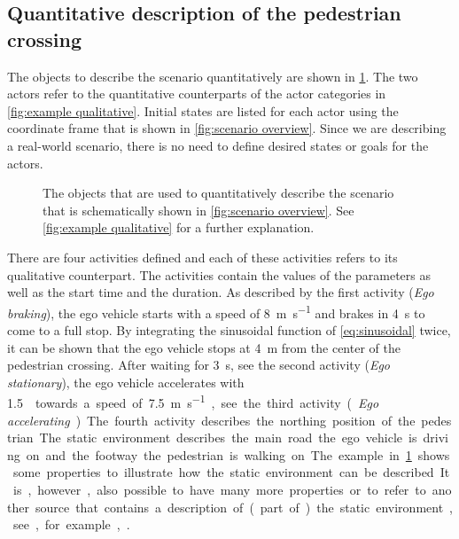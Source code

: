 \subsection{Quantitative description of the pedestrian crossing}
\label{sec:example quantitative}
The objects to describe the scenario quantitatively are shown in \cref{fig:example quantitative}. The two actors refer to the quantitative counterparts of the actor categories in \cref{fig:example qualitative}. Initial states are listed for each actor using the coordinate frame that is shown in \cref{fig:scenario overview}. 
Since we are describing a real-world scenario, there is no need to define desired states or goals for the actors.

\cbend
\begin{figure}
	\centering
	
	\caption{\cbstart The objects that are used to quantitatively describe the scenario that is schematically shown in \cref{fig:scenario overview}. See \cref{fig:example qualitative} for a further explanation.\cbend}
	\label{fig:example quantitative}
\end{figure}
\cbstart

There are four activities defined and each of these activities refers to its qualitative counterpart. The activities contain the values of the parameters as well as the start time and the duration. As described by the first activity (\emph{Ego braking}), the ego vehicle starts with a speed of \SI{8}{\meter\per\second} and brakes in \SI{4}{\second} to come to a full stop. By integrating the sinusoidal function of \cref{eq:sinusoidal} twice, it can be shown that the ego vehicle stops at \SI{4}{\meter} from the center of the pedestrian crossing. After waiting for \SI{3}{\second}, see the second activity (\emph{Ego stationary}), the ego vehicle accelerates with \SI{1.5}{\meter\per\second\square} towards a speed of \SI{7.5}{\meter\per\second}, see the third activity (\emph{Ego accelerating}). The fourth activity describes the northing position of the pedestrian.

The static environment describes the main road the ego vehicle is driving on and the footway the pedestrian is walking on. The example in \cref{fig:example quantitative} shows some properties to illustrate how the static environment can be described. It is, however, also possible to have many more properties or to refer to another source that contains a description of (part of) the static environment, see, for example, \cite{dupuis2010opendrive}. 

